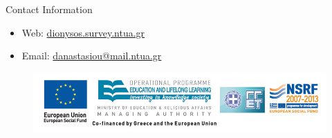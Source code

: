 \documentclass[final,a0,portrait]{beamer}
\newlength{\onecolwid}
\begin{document}
\begin{frame}[t]
\begin{columns}[t]
\begin{column}{\onecolwid}

\begin{alertblock}{Contact Information}
\begin{itemize}
\item Web: \href{http://dionysos.survey.ntua.gr}{dionysos.survey.ntua.gr}
\item Email: \href{danastasiout@mail.ntua.gr}{danastasiou@mail.ntua.gr}
\end{itemize}
\end{alertblock}

\begin{figure}
\includegraphics[width=1.0\linewidth]{ESPA-EKT-GSRT_Logo-EN.JPG}
\end{figure}


\end{column} %

\end{columns} %

\end{frame} %
\end{document}
